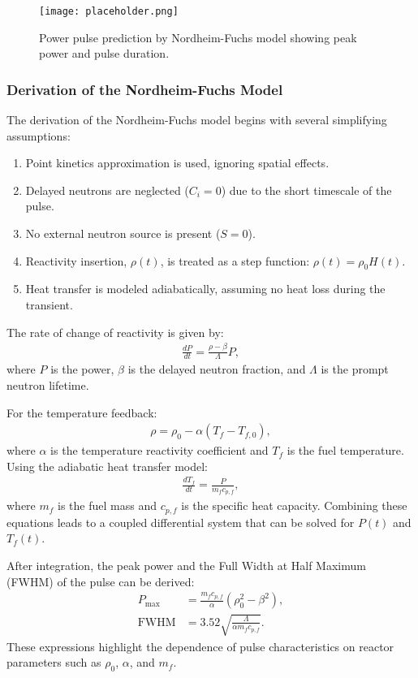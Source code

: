 \begin{figure}[h]
    \centering
    \texttt{[image: placeholder.png]}
    \caption{Power pulse prediction by Nordheim-Fuchs model showing peak power and pulse duration.}
    \label{fig:nordheim_fuchs}
\end{figure}

\subsubsection{Derivation of the Nordheim-Fuchs Model}
The derivation of the Nordheim-Fuchs model begins with several simplifying assumptions:
\begin{enumerate}
    \item Point kinetics approximation is used, ignoring spatial effects.
    \item Delayed neutrons are neglected ($C_i = 0$) due to the short timescale of the pulse.
    \item No external neutron source is present ($S = 0$).
    \item Reactivity insertion, $\rho(t)$, is treated as a step function: $\rho(t) = \rho_0 H(t)$.
    \item Heat transfer is modeled adiabatically, assuming no heat loss during the transient.
\end{enumerate}
The rate of change of reactivity is given by:
\begin{align*}
    \frac{dP}{dt} = \frac{\rho - \beta}{\Lambda}P,
\end{align*}
where $P$ is the power, $\beta$ is the delayed neutron fraction, and $\Lambda$ is the prompt neutron lifetime. 

For the temperature feedback:
\begin{align*}
    \rho = \rho_0 - \alpha(T_f - T_{f,0}),
\end{align*}
where $\alpha$ is the temperature reactivity coefficient and $T_f$ is the fuel temperature. Using the adiabatic heat transfer model:
\begin{align*}
    \frac{dT_f}{dt} = \frac{P}{m_f c_{p,f}},
\end{align*}
where $m_f$ is the fuel mass and $c_{p,f}$ is the specific heat capacity. Combining these equations leads to a coupled differential system that can be solved for $P(t)$ and $T_f(t)$.

After integration, the peak power and the Full Width at Half Maximum (FWHM) of the pulse can be derived:
\begin{align*}
    P_{\text{max}} &= \frac{m_f c_{p,f}}{\alpha}\left(\rho_0^2 - \beta^2\right), \\
    \text{FWHM} &= 3.52\sqrt{\frac{\Lambda}{\alpha m_f c_{p,f}}}.
\end{align*}
These expressions highlight the dependence of pulse characteristics on reactor parameters such as $\rho_0$, $\alpha$, and $m_f$.

